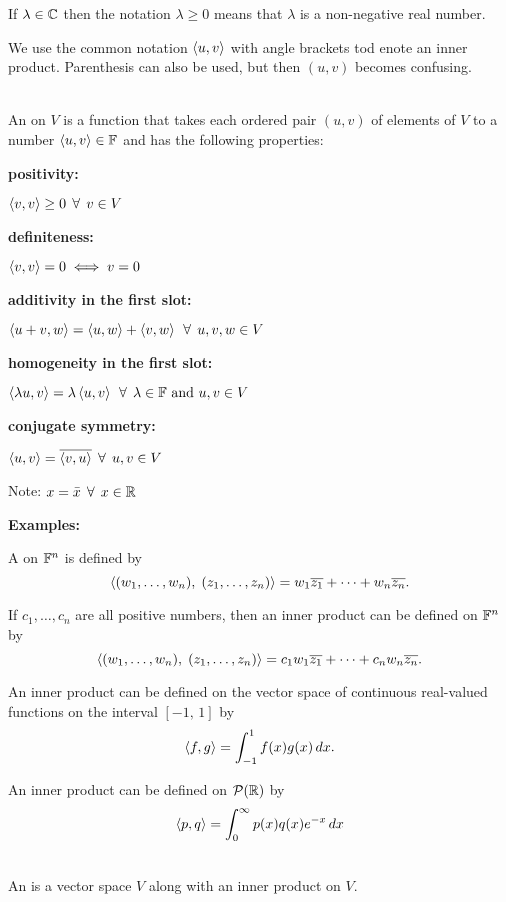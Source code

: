 \nl If $\lambda \in \mathbb{C}$ then the notation $\lambda \geq 0$ means that $\lambda$ is a non-negative real number.

\nl We use the common notation $\left\langle{u,v}\right\rangle$ with angle brackets tod enote an inner product. Parenthesis can also be used, but then $(u,v)$ becomes confusing.

\\An {} on $V$ is a function that takes each ordered pair $(u,v)$ of elements of $V$ to a number $\left\langle{u,v}\right\rangle \in \mathbb{F}$ and has the following properties:

\nl \textbf{positivity: } 

$\left\langle{v,v}\right\rangle \geq 0 \;\, \forall \;\, v \in V$

\nl \textbf{definiteness: }

$\left\langle{v,v}\right\rangle = 0 \iff v = 0$

\nl \textbf{additivity in the first slot: }

$\left\langle{u+v, w}\right\rangle = \left\langle{u,w}\right\rangle + \left\langle{v,w}\right\rangle \;\, \forall \;\, u,v,w \in V$

\nl \textbf{homogeneity in the first slot: }

$\left\langle{\lambda u, v}\right\rangle = \lambda \left\langle{u,v}\right\rangle \;\, \forall \;\, \lambda \in \mathbb{F} \text{ and } u,v \in V$

\nl \textbf{conjugate symmetry: }

$\left\langle{u,v}\right\rangle = \overline{{\left\langle{v,u}\right\rangle}} \;\, \forall \;\, u,v\in V$

\nnnl Note: $x = \bar{x} \;\, \forall \;\, x \in \mathbb{R}$

\nl \textbf{Examples:}

\nl A  on $\mathbb{F}^n$ is defined by
$$\left\langle{({w}_1, \dots, {w}_n),\; ({z}_1, \dots, {z}_n)}\right\rangle = w_1 \overline{z_1} + \cdots + w_n \overline{z_n}.$$

\nnl If $c_1,\dots,c_n$ are all positive numbers, then an inner product can be defined on $\mathbb{F}^n$ by
$$\left\langle{({w}_1, \dots, {w}_n),\; ({z}_1, \dots, {z}_n)}\right\rangle = c_1 w_1 \overline{z_1} + \cdots + c_n w_n \overline{z_n}.$$

\nnl An inner product can be defined on the vector space of continuous real-valued functions on the interval $[-1,\,1]$ by
$$\left\langle{f,g}\right\rangle = \int_{-1}^1 f(x)g(x)\,dx.$$

\nnl An inner product can be defined on $\mathcal{P}(\mathbb{R})$ by 
$$\left\langle{p,q}\right\rangle = \int_0^{\infty} p(x)q(x)e^{-x}\,dx$$

\\
An  is a vector space $V$ along with an inner product on $V$.

